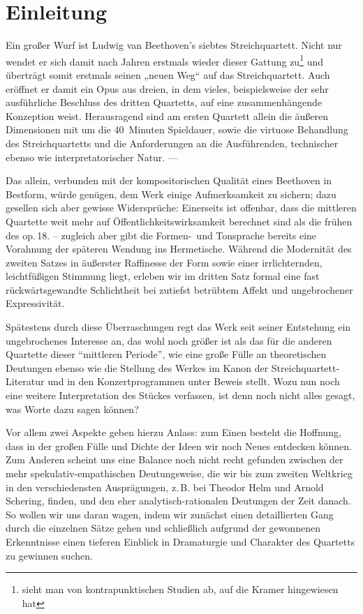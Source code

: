 \section{Einleitung}

Ein großer Wurf ist Ludwig van Beethoven’s siebtes Streichquartett. Nicht
nur wendet er sich damit nach Jahren erstmals wieder dieser Gattung zu\footnote{
sieht man von kontrapunktischen Studien ab, auf die Kramer \parencite{kramer}
hingewiesen hat} und überträgt somit erstmals seinen „neuen Weg“\cite{dahlhaus}
auf das Streichquartett.  Auch eröffnet er damit ein Opus aus dreien, in dem
vieles, beispielsweise der sehr ausführliche Beschluss des dritten Quartetts,
auf eine zusammenhängende Konzeption weist.  Herausragend sind am ersten Quartett
allein die äußeren Dimensionen mit um die 40~Minuten Spieldauer, sowie die
virtuose Behandlung des Streichquartetts und die Anforderungen an die
Ausführenden, technischer ebenso wie interpretatorischer Natur. —

Das allein, verbunden mit der kompositorischen Qualität eines Beethoven
in Bestform, würde genügen, dem Werk einige Aufmerksamkeit zu sichern;
dazu gesellen sich aber gewisse Widersprüche: Einerseits ist offenbar,
dass die mittleren Quartette weit mehr auf Öffentlichkeitswirksamkeit
berechnet sind als die frühen des op.\,18. – zugleich aber gibt die Formen-~und
Tonsprache bereits eine Vorahnung der späteren Wendung ins Hermetische.
Während die Modernität des zweiten Satzes in äußerster Raffinesse der
Form sowie einer irrlichternden, leichtfüßigen Stimmung liegt, erleben
wir im dritten Satz formal eine fast rückwärtsgewandte Schlichtheit bei
zutiefst betrübtem Affekt und ungebrochener Expressivität.

Spätestens durch diese Überraschungen regt das Werk seit seiner Entstehung
ein ungebrochenes Interesse an, das wohl noch größer ist als das für die
anderen Quartette dieser \enquote{mittleren Periode}, wie eine große Fülle
an theoretischen Deutungen ebenso wie die Stellung des Werkes im Kanon der
Streichquartett-Literatur und in den Konzertprogrammen unter Beweis
stellt.  Wozu nun noch eine weitere Interpretation des Stückes verfassen,
ist denn noch nicht alles gesagt, was Worte dazu sagen können?

Vor allem zwei Aspekte geben hierzu Anlass: zum Einen besteht die Hoffnung,
dass in der großen Fülle und Dichte der Ideen wir noch Neues entdecken
können.  Zum Anderen scheint uns eine Balance noch nicht recht gefunden
zwischen der mehr spekulativ-empathischen Deutungsweise, die wir bis zum
zweiten Weltkrieg in den verschiedensten Ausprägungen, z.\,B. bei Theodor
Helm\cite{helm} und Arnold Schering\cite{schering}, finden, und den eher
analytisch-rationalen Deutungen der Zeit danach.  So wollen wir uns daran
wagen, indem wir zunächst einen detaillierten Gang durch die einzelnen
Sätze gehen und schließlich aufgrund der gewonnenen Erkenntnisse einen
tieferen Einblick in Dramaturgie und Charakter des Quartetts zu gewinnen suchen.